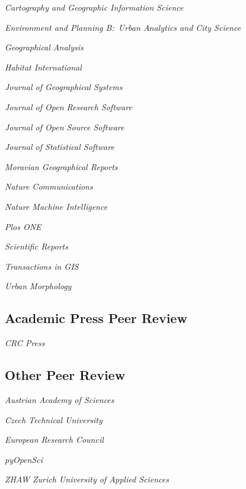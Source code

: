 \documentclass[12pt,a4paper]{report}
\newcommand{\listitemspace}{0.25em}
\renewenvironment{itemize}
{\begin{list}{}{\setlength{\leftmargin}{0em}
                \setlength{\parskip}{0em}
                \setlength{\itemsep}{\listitemspace}
                \setlength{\parsep}{\listitemspace}}}
{\end{list}}
\begin{document}
    \begin{itemize}

        \item \textit{Cartography and Geographic Information Science}
        \item \textit{Environment and Planning B:\ Urban Analytics and City Science}
        \item \textit{Geographical Analysis}
        \item \textit{Habitat International}
        \item \textit{Journal of Geographical Systems}
        \item \textit{Journal of Open Research Software}
        \item \textit{Journal of Open Source Software}
        \item \textit{Journal of Statistical Software}
        \item \textit{Moravian Geographical Reports}
        \item \textit{Nature Communications}
        \item \textit{Nature Machine Intelligence}
        \item \textit{Plos ONE}
        \item \textit{Scientific Reports}
        \item \textit{Transactions in GIS}
        \item \textit{Urban Morphology}

    \end{itemize}

    \subsection*{Academic Press Peer Review}

    \begin{itemize}

        \item \textit{CRC Press}

    \end{itemize}

    \subsection*{Other Peer Review}

    \begin{itemize}

        \item \textit{Austrian Academy of Sciences}
        \item \textit{Czech Technical University}
        \item \textit{European Research Council}
        \item \textit{pyOpenSci}
        \item \textit{ZHAW Zurich University of Applied Sciences}

    \end{itemize}
\end{document}
